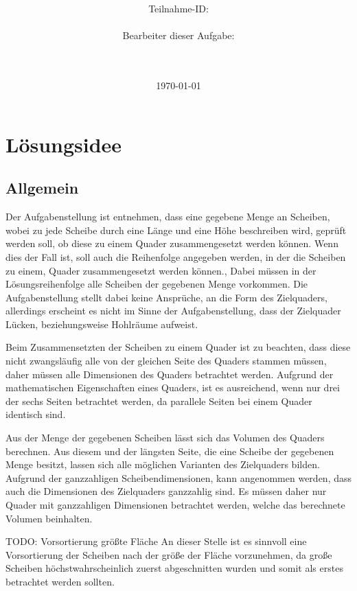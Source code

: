 \documentclass[a4paper,10pt,ngerman]{scrartcl}
\title{\textbf{\Huge\Aufgabe}}
\author{\LARGE Teilnahme-ID: \LARGE \TeilnahmeId \\\\
\LARGE Bearbeiter dieser Aufgabe: \\
\LARGE \Name\\\\}
\date{\LARGE\today}
\begin{document}
    \maketitle
    \tableofcontents
    \vspace{0.5cm}
    \newpage


    \section{Lösungsidee}\label{sec:losungsidee}

    \subsection{Allgemein}\label{subsec:allgemein}

    Der Aufgabenstellung ist entnehmen, dass eine gegebene Menge an Scheiben, wobei zu jede Scheibe durch
    eine Länge und eine Höhe beschreiben wird, geprüft werden soll, ob diese zu einem Quader zusammengesetzt werden können.
    Wenn dies der Fall ist, soll auch die Reihenfolge angegeben werden, in der die Scheiben zu einem, Quader zusammengesetzt werden können.,
    Dabei müssen in der Lösungsreihenfolge alle Scheiben der gegebenen Menge vorkommen.
    Die Aufgabenstellung stellt dabei keine Ansprüche, an die Form des Zielquaders, allerdings erscheint es nicht im Sinne der Aufgabenstellung,
    dass der Zielquader Lücken, beziehungsweise Hohlräume aufweist.

    Beim Zusammensetzten der Scheiben zu einem Quader ist zu beachten, dass diese nicht zwangsläufig alle von der gleichen Seite des Quaders stammen müssen,
    daher müssen alle Dimensionen des Quaders betrachtet werden.
    Aufgrund der mathematischen Eigenschaften eines Quaders, ist es ausreichend, wenn nur drei der sechs Seiten betrachtet werden,
    da parallele Seiten bei einem Quader identisch sind.

    Aus der Menge der gegebenen Scheiben lässt sich das Volumen des Quaders berechnen.
    Aus diesem und der längsten Seite, die eine Scheibe der gegebenen Menge besitzt, lassen sich alle möglichen Varianten des Zielquaders bilden.
    Aufgrund der ganzzahligen Scheibendimensionen, kann angenommen werden, dass auch die Dimensionen des Zielquaders ganzzahlig sind.
    Es müssen daher nur Quader mit ganzzahligen Dimensionen betrachtet werden, welche das berechnete Volumen beinhalten.

    TODO: Vorsortierung größte Fläche
    An dieser Stelle ist es sinnvoll eine Vorsortierung der Scheiben nach der größe der Fläche vorzunehmen,
    da große Scheiben höchstwahrscheinlich zuerst abgeschnitten wurden und somit als erstes betrachtet werden sollten.
\end{document}
